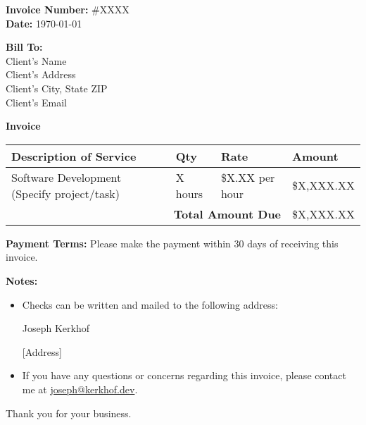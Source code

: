 \documentclass[a4paper, 11pt]{article}
\begin{document}
\begin{flushright}
    \textbf{Invoice Number:} \#XXXX \\
    \textbf{Date:} \today
\end{flushright}

\begin{flushleft}
\textbf{Bill To:} \\
Client's Name \\
Client's Address \\
Client's City, State ZIP \\
Client's Email
\end{flushleft}

\vspace{2em}

\begin{center}
\textbf{\Large Invoice}
\end{center}

\begin{tabular}{|p{}|p{}|p{}|p{}|}
    \hline
    \textbf{Description of Service} & \textbf{Qty} & \textbf{Rate} & \textbf{Amount} \\
    \hline
    Software Development (Specify project/task) & X hours & \$X.XX per hour & \$X,XXX.XX \\
    \hline
    \multicolumn{3}{|r|}{\textbf{Total Amount Due}} & \$X,XXX.XX \\
    \hline
\end{tabular}

\vspace{2em}

\textbf{Payment Terms:} Please make the payment within 30 days of receiving this invoice.

\vspace{2em}

\textbf{Notes:}
\begin{itemize}
    \item Checks can be written and mailed to the following address:

    Joseph Kerkhof

    [Address]

    \item If you have any questions or concerns regarding this invoice, please contact me at \href{mailto:joseph@kerkhof.dev}{joseph@kerkhof.dev}.
\end{itemize}

\vspace{2em}

Thank you for your business.
\end{document}
